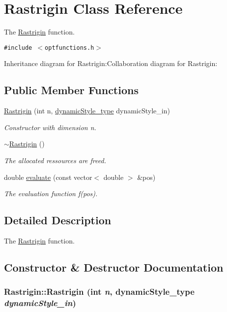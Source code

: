 \hypertarget{classRastrigin}{
\section{Rastrigin Class Reference}
\label{classRastrigin}
}
The \hyperlink{classRastrigin}{Rastrigin} function.  


{\tt \#include $<$optfunctions.h$>$}

Inheritance diagram for Rastrigin:Collaboration diagram for Rastrigin:\subsection*{Public Member Functions}
\begin{CompactItemize}
\item 
\hyperlink{classRastrigin_49b26cc4c0afa49a791b35bc2385b17c}{Rastrigin} (int n, \hyperlink{optfunctions_8h_ae9aa3a5dd199a43e77abc2cccf4477e}{dynamicStyle\_\-type} dynamicStyle\_\-in)
\begin{CompactList}\small\item\em Constructor with dimension n. \item\end{CompactList}\item 
\hyperlink{classRastrigin_2d87813baa436f94a5081994faf60662}{$\sim$Rastrigin} ()
\begin{CompactList}\small\item\em The allocated ressources are freed. \item\end{CompactList}\item 
double \hyperlink{classRastrigin_2b969cef4e9fe1a82e6550ab2cb74bd1}{evaluate} (const vector$<$ double $>$ \&pos)
\begin{CompactList}\small\item\em The evaluation function f(pos). \item\end{CompactList}\end{CompactItemize}


\subsection{Detailed Description}
The \hyperlink{classRastrigin}{Rastrigin} function. 

\subsection{Constructor \& Destructor Documentation}
\hypertarget{classRastrigin_49b26cc4c0afa49a791b35bc2385b17c}{
\subsubsection{\setlength{\rightskip}{0pt plus 5cm}Rastrigin::Rastrigin (int {\em n}, \/  {\bf dynamicStyle\_\-type} {\em dynamicStyle\_\-in})}}
\label{classRastrigin_49b26cc4c0afa49a791b35bc2385b17c}


